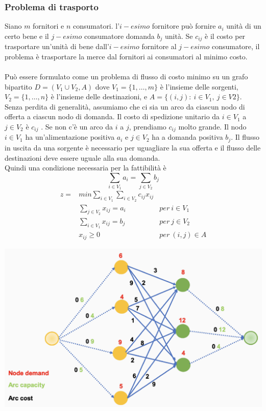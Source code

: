 \documentclass[12pt,a4paper]{article}
\begin{document}
\subsubsection{Problema di trasporto}
Siano $m$ fornitori e $n$ consumatori. l'$i-esimo$ fornitore può fornire $a_i$ unità di un certo bene e il $j-esimo$ consumatore domanda $b_j$ unità. Se $c_{ij}$ è il costo per trasportare un'unità di bene dall'$i-esimo$ fornitore al $j-esimo$ consumatore, il problema è trasportare la merce dal fornitori ai consumatori al minimo costo.\\
\\
Può essere formulato come un problema di flusso di costo minimo su un grafo bipartito $D = (V_1 \cup V_2,A)$ dove $V_1 = \{1, \dots ,m\}$ è l'insieme delle sorgenti, $V_2 = \{1, \dots , n\}$ è l'insieme delle destinazioni, e $A = \{(i, j) :\ i \in V_1,\ j \in V2\}$. Senza perdita di generalità, assumiamo che ci sia un arco da ciascun nodo di offerta a ciascun nodo di domanda. Il costo di spedizione unitario da $i \in V_1$ a $j\in V_2$ è $c_{ij}$ . Se non c'è un arco da $i$ a $j$, prendiamo $c_{ij}$ molto grande. Il nodo $i \in V_1$ ha un'alimentazione positiva $a_i$ e $j \in V_2$ ha a domanda positiva $b_j$. Il flusso in uscita da una sorgente è necessario per uguagliare la sua offerta e il flusso delle destinazioni deve essere uguale alla sua domanda.\\
Quindi una condizione necessaria per la fattibilità è 
$$\sum_{i\in V_1}a_i = \sum_{j\in V_2}b_j$$
$$\begin{array}{rll}
z = & min \sum_{i\in V_1}\sum_{i \in V_2} c_{ij}x_{ij} &\\
& \sum_{j \in V_2}x_{ij} = a_i & per\ i\in V_1\\
& \sum_{i \in V_1}x_{ij} = b_j & per\ j\in V_2\\
& x_{ij} \geq 0 & per\ (i,j) \in A
\end{array}$$
\begin{center}
\includegraphics[width=0.5\columnwidth]{img/tp.png}
\end{center}
\end{document}
